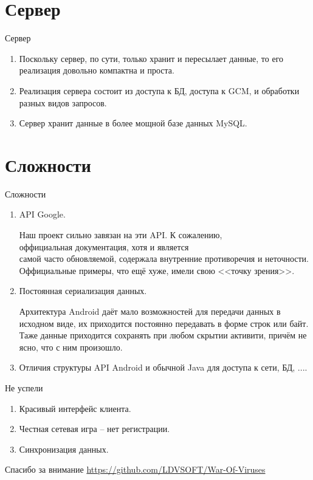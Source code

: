 \documentclass{beamer}
\newcommand{\cimg}[2]{%
    \begin{center}%
        \ifthenelse{\equal{#2}{}}{%
            \texttt{[image: \#1]}
        }{%
            \texttt{[image: \#1]}
        }%
    \end{center}%
}
\begin{document}
\section{Сервер}

\begin{frame}[t]{Сервер}
		\begin{enumerate}
		\item
			Поскольку сервер, по сути, только хранит и пересылает данные, то его реализация довольно компактна
			и проста.
		\pause
		\item
			Реализация сервера состоит из доступа к БД, доступа к GCM, и обработки разных видов запросов.
			\pause
			\item Сервер хранит данные в более мощной базе данных MySQL.
		\end{enumerate}
		\cimg{05.png}{0.4}
\end{frame}

\section{Сложности}
\begin{frame}[t]{Сложности}
	\begin{enumerate}
			\item API Google.

				Наш проект сильно завязан на эти API. К сожалению, \\оффициальная документация, хотя и является \\самой часто обновляемой, содержала внутренние противоречия и неточности. \\Оффициальные примеры, что ещё хуже, имели свою <<точку зрения>>.
			\pause
			\item Постоянная сериализация данных.

				Архитектура Android даёт мало возможностей для передачи данных в исходном виде, их приходится постоянно передавать в форме строк или байт. Таже данные приходится сохранять при любом скрытии активити, причём не ясно, что с ним произошло.

				\pause
			\item Отличия структуры API Android и обычной Java для доступа к сети, БД, ....
	\end{enumerate}
\end{frame}

\begin{frame}[t]{Не успели}
		\begin{enumerate}
				\item Красивый интерфейс клиента.

				\pause
				\item Честная сетевая игра -- нет регистрации.

				\pause
				\item Синхронизация данных.
		\end{enumerate}
\end{frame}

\begin{frame}[t]{Спасибо за внимание}
	\url{https://github.com/LDVSOFT/War-Of-Viruses}
\end{frame}
\end{document}
